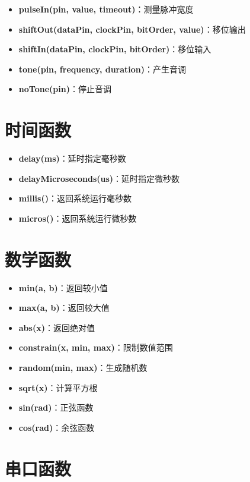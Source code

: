 \documentclass[12pt,UTF8]{ctexbook}
\begin{document}
\begin{itemize}
    \item \textbf{pulseIn(pin, value, timeout)}：测量脉冲宽度
    \item \textbf{shiftOut(dataPin, clockPin, bitOrder, value)}：移位输出
    \item \textbf{shiftIn(dataPin, clockPin, bitOrder)}：移位输入
    \item \textbf{tone(pin, frequency, duration)}：产生音调
    \item \textbf{noTone(pin)}：停止音调
\end{itemize}

\section{时间函数}

\begin{itemize}
    \item \textbf{delay(ms)}：延时指定毫秒数
    \item \textbf{delayMicroseconds(us)}：延时指定微秒数
    \item \textbf{millis()}：返回系统运行毫秒数
    \item \textbf{micros()}：返回系统运行微秒数
\end{itemize}

\section{数学函数}

\begin{itemize}
    \item \textbf{min(a, b)}：返回较小值
    \item \textbf{max(a, b)}：返回较大值
    \item \textbf{abs(x)}：返回绝对值
    \item \textbf{constrain(x, min, max)}：限制数值范围
    \item \textbf{random(min, max)}：生成随机数
    \item \textbf{sqrt(x)}：计算平方根
    \item \textbf{sin(rad)}：正弦函数
    \item \textbf{cos(rad)}：余弦函数
\end{itemize}

\section{串口函数}
\end{document}

